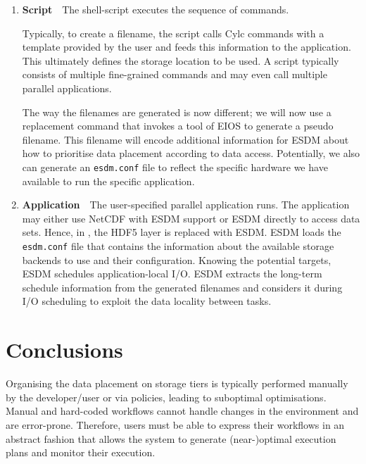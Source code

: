 \documentclass[a4paper]{article}
\begin{document}
\begin{enumerate}
  \item \textbf{Script}\ \ The shell-script executes the sequence of commands.

  Typically, to create a filename, the script calls Cylc commands with a template provided by the user and feeds this information to the application.
  This ultimately defines the storage location to be used.
  A script typically consists of multiple fine-grained commands and may even call multiple parallel applications.

  The way the filenames are generated is now different; we will now use a replacement command that invokes a tool of EIOS to generate a pseudo filename.
  This filename will encode additional information for ESDM about how to prioritise data placement according to data access.
  Potentially, we also can generate an \texttt{esdm.conf} file to reflect the specific hardware we have available to run the specific application.

  \item \textbf{Application}\ \ The user-specified parallel application runs.
  The application may either use NetCDF with ESDM support or ESDM directly to access data sets.
  Hence, in , the HDF5 layer is replaced with ESDM.
  ESDM loads the \texttt{esdm.conf} file that contains the information about the available storage backends to use and their configuration.
  Knowing the potential targets, ESDM schedules application-local I/O.
  ESDM extracts the long-term schedule information from the generated filenames and considers it during I/O scheduling to exploit the data locality between tasks.
\end{enumerate}



\section{Conclusions}
\label{sec:conclusions}

Organising the data placement on storage tiers is typically performed manually by the developer/user or via policies, leading to suboptimal optimisations.
Manual and hard-coded workflows cannot handle changes in the environment and are error-prone.
Therefore, users must be able to express their workflows in an abstract fashion that allows the system to generate (near-)optimal execution plans and monitor their execution.
\end{document}
